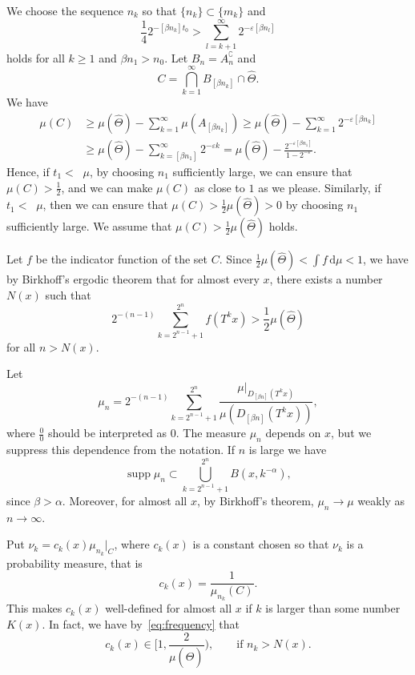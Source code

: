 \documentclass[10pt]{amsart}
\theoremstyle{definition}\newtheorem{defi}[theo]{Definition}\newtheorem{rema}[theo]{Remark}\newtheorem{exam}[theo]{Example}\newtheorem{exem}[theo]{Example}\newtheorem{nota}[theo]{Notation}
\DeclareMathOperator{\ldimh}{\underline{dim}_H}
\DeclareMathOperator{\udimh}{\overline{dim}_H}
\DeclareMathOperator{\supp}{supp}
\newcommand*{\dd}{\mathrm{d}}
\begin{document}
We choose the sequence $n_k$ so that $\{n_k\} \subset \{m_k\}$ and
\begin{equation}\label{eq:nk2}
\frac{1}{4} 2^{- [\beta n_k] t_0} > \sum_{l = k+1}^\infty 2^{-
\varepsilon [\beta n_l]}
\end{equation}
holds for all $k \geq 1$ and $\beta n_1 > n_0$. Let $B_n = A_n^\complement$ and
\[
C = \bigcap_{k=1}^\infty B_{[\beta n_k]} \cap \hat{\Theta}.
\]
We have
\begin{align*}
\mu (C) &\geq \mu (\hat{\Theta}) - \sum_{k=1}^\infty \mu (A_{[\beta n_k]}) \geq \mu (\hat{\Theta}) - \sum_{k=1}^\infty 2^{-
\varepsilon [\beta n_k]} \\ &\geq \mu (\hat{\Theta}) -
\sum_{k=[\beta n_1]}^\infty 2^{-\varepsilon k} = \mu (\hat{\Theta}) - \frac{2^{-\varepsilon [\beta n_1]}}{1 - 2^{-\varepsilon}}.
\end{align*}
Hence, if $t_1 < \ldimh \mu$, by choosing $n_1$ sufficiently large, we can ensure that $\mu (C) > \frac{1}{2}$, and we can make $\mu (C)$ as close to $1$ as we please. Similarly, if $t_1 < \udimh \mu$, then we can ensure that $\mu (C) > \frac{1}{2} \mu (\hat{\Theta}) > 0$ by choosing $n_1$ sufficiently large. We assume that $\mu (C) >
\frac{1}{2} \mu (\hat{\Theta})$ holds.

Let $f$ be the indicator function of the set $C$. Since $\frac{1}{2}
\mu (\hat{\Theta}) < \int f \, \dd \mu < 1$, we have by Birkhoff's ergodic theorem that for almost every $x$, there exists a number $N(x)$ such that
\begin{equation}\label{eq:frequency}
2^{-(n-1)} \sum_{k = 2^{n-1} + 1}^{2^n} f (T^k x) > \frac{1}{2} \mu (\hat{\Theta})
\end{equation}
for all $n > N (x)$.

Let
\[
\mu_n = 2^{-(n-1)} \sum_{k = 2^{n-1} + 1}^{2^n} \frac{\mu |_{D_{[\beta n]} (T^k x)}}{\mu (D_{[\beta n]} (T^k x))},
\]
where $\frac{0}{0}$ should be interpreted as $0$. The measure $\mu_n$ depends on $x$, but we suppress this dependence from the notation. If $n$ is large we have
\[
\supp \mu_n \subset \bigcup_{k = 2^{n-1}+1}^{2^n} B(x,k^{-\alpha}),
\]
since $\beta > \alpha$. Moreover, for almost all $x$, by Birkhoff's theorem, $\mu_n \to \mu$ weakly as $n \to \infty$.

Put $\nu_k = c_k(x) \mu_{n_k}|_C$, where $c_k (x)$ is a constant chosen so that $\nu_k$ is a probability measure, that is
\[
c_k (x) = \frac{1}{\mu_{n_k} (C)}.
\]
This makes $c_k (x)$ well-defined for almost all $x$ if $k$ is larger than some number $K(x)$. In fact, we have by~\eqref{eq:frequency} that
\[
c_k (x) \in \biggl[1,\frac{2}{\mu(\hat{\Theta})} \biggr), \qquad
\text{if } n_k > N(x).
\]
\end{document}
